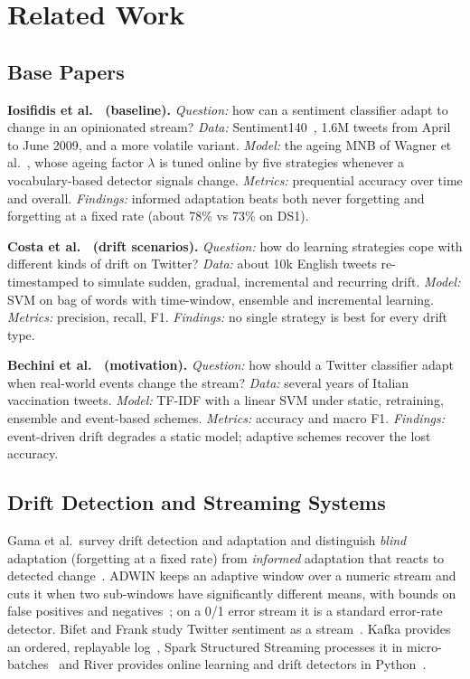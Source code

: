 \documentclass[conference]{IEEEtran}
\begin{document}
\section{Related Work}
\subsection{Base Papers}
\textbf{Iosifidis et al.~\cite{iosifidis2017} (baseline).} \emph{Question:} how can a sentiment
classifier adapt to change in an opinionated stream? \emph{Data:} Sentiment140~\cite{go2009},
1.6M tweets from April to June 2009, and a more volatile variant. \emph{Model:} the ageing MNB
of Wagner et al.~\cite{wagner2015}, whose ageing factor $\lambda$ is tuned online by five
strategies whenever a vocabulary-based detector signals change. \emph{Metrics:} prequential
accuracy over time and overall. \emph{Findings:} informed adaptation beats both never forgetting
and forgetting at a fixed rate (about 78\% vs 73\% on DS1).

\textbf{Costa et al.~\cite{costa2014} (drift scenarios).} \emph{Question:} how do learning
strategies cope with different kinds of drift on Twitter? \emph{Data:} about 10k English tweets
re-timestamped to simulate sudden, gradual, incremental and recurring drift. \emph{Model:} SVM on
bag of words with time-window, ensemble and incremental learning. \emph{Metrics:} precision,
recall, F1. \emph{Findings:} no single strategy is best for every drift type.

\textbf{Bechini et al.~\cite{bechini2021} (motivation).} \emph{Question:} how should a Twitter
classifier adapt when real-world events change the stream? \emph{Data:} several years of Italian
vaccination tweets. \emph{Model:} TF-IDF with a linear SVM under static, retraining, ensemble and
event-based schemes. \emph{Metrics:} accuracy and macro F1. \emph{Findings:} event-driven drift
degrades a static model; adaptive schemes recover the lost accuracy.

\subsection{Drift Detection and Streaming Systems}
Gama et al.\ survey drift detection and adaptation and distinguish \emph{blind} adaptation
(forgetting at a fixed rate) from \emph{informed} adaptation that reacts to detected
change~\cite{gama2014}. ADWIN keeps an adaptive window over a numeric stream and cuts it when two
sub-windows have significantly different means, with bounds on false positives and
negatives~\cite{bifet2007}; on a 0/1 error stream it is a standard error-rate detector. Bifet and
Frank study Twitter sentiment as a stream~\cite{bifet2010}. Kafka provides an ordered, replayable
log~\cite{kreps2011}, Spark Structured Streaming processes it in micro-batches~\cite{armbrust2018}
and River provides online learning and drift detectors in Python~\cite{montiel2021}.
\end{document}
